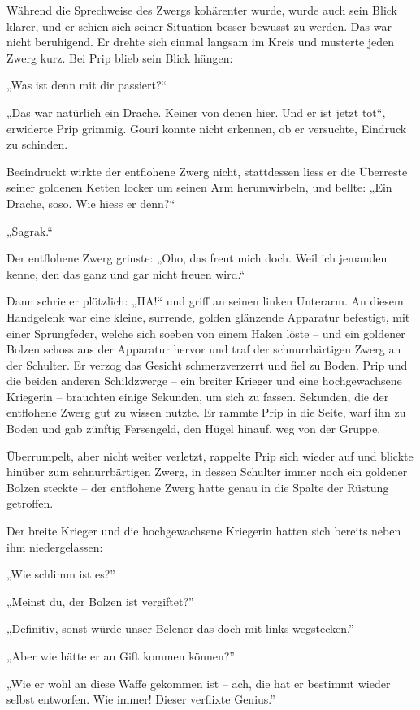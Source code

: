 Während die Sprechweise des Zwergs kohärenter wurde, wurde auch sein Blick klarer, und er schien sich seiner Situation besser bewusst zu werden. Das war nicht beruhigend. Er drehte sich einmal langsam im Kreis und musterte jeden Zwerg kurz. Bei Prip blieb sein Blick hängen:

„Was ist denn mit dir passiert?“

„Das war natürlich ein Drache. Keiner von denen hier. Und er ist jetzt tot“, erwiderte Prip grimmig. Gouri konnte nicht erkennen, ob er versuchte, Eindruck zu schinden.

Beeindruckt wirkte der entflohene Zwerg nicht, stattdessen liess er die Überreste seiner goldenen Ketten locker um seinen Arm herumwirbeln, und bellte: „Ein Drache, soso. Wie hiess er denn?“

„Sagrak.“

Der entflohene Zwerg grinste: „Oho, das freut mich doch. Weil ich jemanden kenne, den das ganz und gar nicht freuen wird.“

Dann schrie er plötzlich: „HA!“ und griff an seinen linken Unterarm. An diesem Handgelenk war eine kleine, surrende, golden glänzende Apparatur befestigt, mit einer Sprungfeder, welche sich soeben von einem Haken löste – und ein goldener Bolzen schoss aus der Apparatur hervor und traf der schnurrbärtigen Zwerg an der Schulter. Er verzog das Gesicht schmerzverzerrt und fiel zu Boden. Prip und die beiden anderen Schildzwerge – ein breiter Krieger und eine hochgewachsene Kriegerin – brauchten einige Sekunden, um sich zu fassen. Sekunden, die der entflohene Zwerg gut zu wissen nutzte. Er rammte Prip in die Seite, warf ihn zu Boden und gab zünftig Fersengeld, den Hügel hinauf, weg von der Gruppe.

Überrumpelt, aber nicht weiter verletzt, rappelte Prip sich wieder auf und blickte hinüber zum schnurrbärtigen Zwerg, in dessen Schulter immer noch ein goldener Bolzen steckte – der entflohene Zwerg hatte genau in die Spalte der Rüstung getroffen.

Der breite Krieger und die hochgewachsene Kriegerin hatten sich bereits neben ihm niedergelassen:

„Wie schlimm ist es?”

„Meinst du, der Bolzen ist vergiftet?”

„Definitiv, sonst würde unser Belenor das doch mit links wegstecken.”

„Aber wie hätte er an Gift kommen können?”

„Wie er wohl an diese Waffe gekommen ist – ach, die hat er bestimmt wieder selbst entworfen. Wie immer! Dieser verflixte Genius.”

